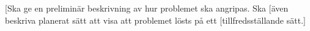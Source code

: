 [Ska ge en preliminär beskrivning av hur problemet ska angripas. Ska
[även beskriva planerat sätt att visa att problemet lösts på ett
[tillfredsställande sätt.]
